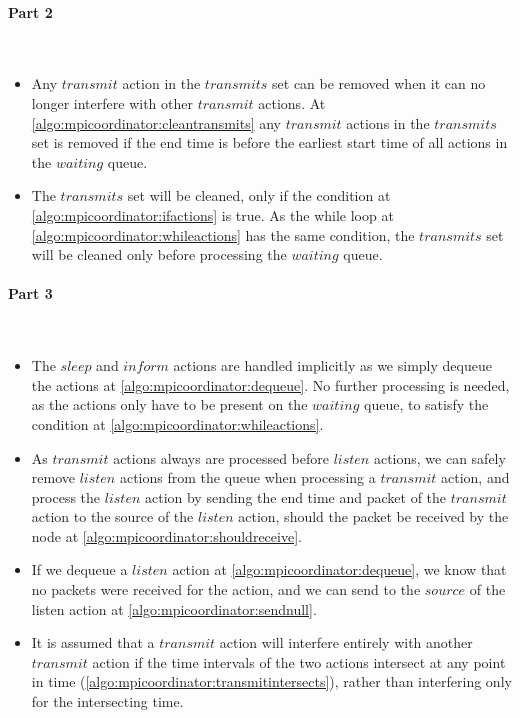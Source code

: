 \paragraph{Part 2} \

\begin{itemize}
    \item Any $transmit$ action in the $transmits$ set can be removed when it can no longer interfere with other $transmit$ actions. At \autoref{algo:mpicoordinator:cleantransmits} any $transmit$ actions in the $transmits$ set is removed if the end time is before the earliest start time of all actions in the $waiting$ queue.
    \item The $transmits$ set will be cleaned, only if the condition at \autoref{algo:mpicoordinator:ifactions} is true. As the while loop at \autoref{algo:mpicoordinator:whileactions} has the same condition, the $transmits$ set will be cleaned only before processing the $waiting$ queue.
\end{itemize}

\paragraph{Part 3} \

\begin{itemize}
    \item The $sleep$ and $inform$ actions are handled implicitly as we simply dequeue the actions at \autoref{algo:mpicoordinator:dequeue}. No further processing is needed, as the actions only have to be present on the $waiting$ queue, to satisfy the condition at \autoref{algo:mpicoordinator:whileactions}.
    \item As $transmit$ actions always are processed before $listen$ actions, we can safely remove $listen$ actions from the queue when processing a $transmit$ action, and process the $listen$ action by sending the end time and packet of the $transmit$ action to the source of the $listen$ action, should the packet be received by the node at \autoref{algo:mpicoordinator:shouldreceive}.
    \item If we dequeue a $listen$ action at \autoref{algo:mpicoordinator:dequeue}, we know that no packets were received for the action, and we can send \KwNull to the $source$ of the listen action at \autoref{algo:mpicoordinator:sendnull}.
    \item It is assumed that a $transmit$ action will interfere entirely with another $transmit$ action if the time intervals of the two actions intersect at any point in time (\autoref{algo:mpicoordinator:transmitintersects}), rather than interfering only for the intersecting time.
\end{itemize}
